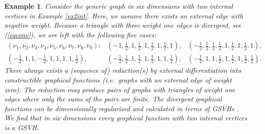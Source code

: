 \documentclass[oneside]{amsart}
\theoremstyle{plain}
\newtheorem{ex}[thm]{Example}
\begin{document}
\begin{ex}\label{exgen}
Consider the generic graph in six dimensions with two internal vertices in Example \ref{ex2int}.
Here, we assume there exists an external edge with negative weight. Because a triangle with three weight one edges is divergent, see (\ref{eqconv}), we are left with the following five cases:
\begin{eqnarray*}
(\nu_1,\nu_2,\nu_3,\nu_4,\nu_5,\nu_6,\nu_7,\nu_8,\nu_9):&(-1,\frac{1}{2},1,\frac{1}{2},1,\frac{1}{2},1,\frac{1}{2},1),&
\textstyle(-\frac{1}{2},\frac{1}{2},\frac{1}{2},\frac{1}{2},1,\frac{1}{2},1,\frac{1}{2},1),\\
\textstyle(-\frac{1}{2},1,1,-\frac{1}{2},1,1,1,1,\frac{1}{2}),&(-\frac{1}{2},\frac{1}{2},1,\frac{1}{2},1,\frac{1}{2},1,1,\frac{1}{2}),&
\textstyle(-\frac{1}{2},1,1,\frac{1}{2},1,\frac{1}{2},1,\frac{1}{2},\frac{1}{2}).
\end{eqnarray*}
There always exists a (sequence of) reduction(s) by external differentiation into constructible graphical functions (i.e.\ graphs with an external edge of weight zero).
The reduction may produce pairs of graphs with triangles of weight one edges where only the sums of the pairs are finite. The divergent graphical
functions can be dimensionally regularized \cite{numfunct,7loops} and calculated in terms of GSVHs \cite{Shlog}. We find that in six dimensions every graphical function with
two internal vertices is a GSVH.
\end{ex}
\end{document}
